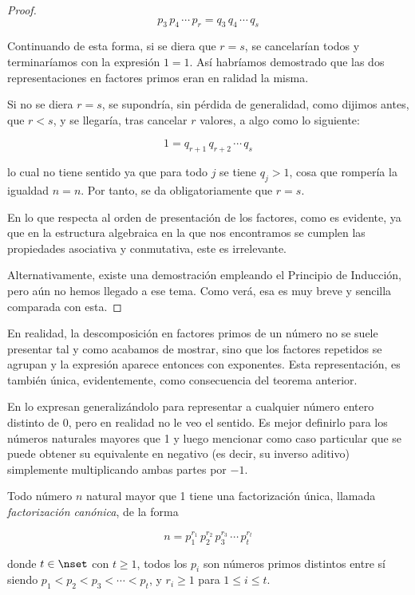 \begin{proof}
  $$ p_3 \, p_4 \, \cdots \, p_r = q_3 \, q_4 \, \cdots \, q_s $$

  Continuando de esta forma, si se diera que $r = s$, se cancelarían todos y
  terminaríamos con la expresión $1 = 1$. Así habríamos demostrado que las
  dos representaciones en factores primos eran en ralidad la misma.

  Si no se diera $r = s$, se supondría, sin pérdida de generalidad, como
  dijimos antes, que $r < s$, y se llegaría, tras cancelar $r$ valores, a
  algo como lo siguiente:

  $$ 1 = q_{r+1} \, q_{r+2} \, \cdots \, q_s $$

  \noindent lo cual no tiene sentido ya que para todo $j$ se tiene $q_j >
  1$, cosa que rompería la igualdad $n = n$. Por tanto, se da
  obligatoriamente que $r = s$.

  En lo que respecta al orden de presentación de los factores, como es
  evidente, ya que en la estructura algebraica en la que nos encontramos se
  cumplen las propiedades asociativa y conmutativa, este es irrelevante.

  Alternativamente, existe una demostración empleando el Principio de
  Inducción, pero aún no hemos llegado a ese tema. Como verá, esa es muy
  breve y sencilla comparada con esta.
\end{proof}

En realidad, la descomposición en factores primos de un número no se suele
presentar tal y como acabamos de mostrar, sino que los factores repetidos se
agrupan y la expresión aparece entonces con exponentes. Esta representación,
es también única, evidentemente, como consecuencia del teorema anterior.

En \cite{texto-uned} lo expresan generalizándolo para representar a
cualquier número entero distinto de 0, pero en realidad no le veo el
sentido. Es mejor definirlo para los números naturales mayores que 1 y luego
mencionar como caso particular que se puede obtener su equivalente en
negativo (es decir, su inverso aditivo) simplemente multiplicando ambas
partes por ${-1}$.

\begin{corollary}
  Todo número $n$ natural mayor que 1 tiene una factorización única, llamada
  \emph{factorización canónica}, de la forma

  $$ n = p_1^{r_1} \, p_2^{r_2} \, p_3^{r_3} \, \cdots \, p_t^{r_t} $$

  \noindent donde $t \in \nset$ con $t \geq 1$, todos los $p_i$ son números
  primos distintos entre sí siendo $p_1 < p_2 < p_3 < \cdots < p_t$, y $r_i
  \geq 1$ para $1 \leq i \leq t$.
\end{corollary}

